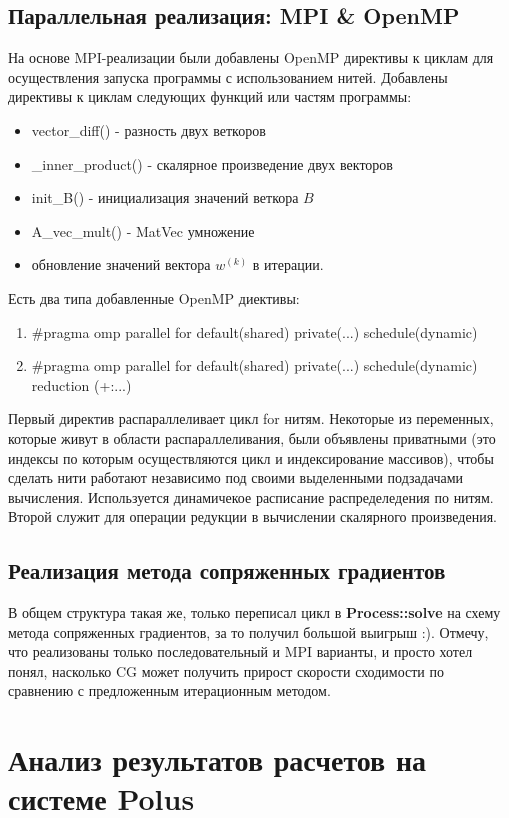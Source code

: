 \documentclass{article}
\begin{document}
\subsection{Параллельная реализация: MPI \& OpenMP}
На основе MPI-реализации были добавлены OpenMP директивы к циклам для осуществления запуска программы с использованием нитей. Добавлены директивы к циклам следующих функций или частям программы:
\begin{itemize}
    \item vector\_diff() - разность двух веткоров
    \item \_inner\_product() - скалярное произведение двух векторов
    \item init\_B() - инициализация значений веткора $B$
    \item A\_vec\_mult() - MatVec умножение
    \item обновление значений вектора $w^{(k)}$ в итерации.
\end{itemize}
Есть два типа добавленные OpenMP диективы:
\begin{enumerate}
    \item \#pragma omp parallel for default(shared) private(...) schedule(dynamic)
    \item \#pragma omp parallel for default(shared) private(...) schedule(dynamic) reduction (+:...)
\end{enumerate}
Первый директив распараллеливает цикл for нитям. Некоторые из переменных, которые живут в области распараллеливания, были объявлены приватными (это индексы по которым осуществляются цикл и индексирование массивов), чтобы сделать нити работают независимо под своими выделенными подзадачами вычисления. Используется динамичекое расписание распределедения по нитям. Второй служит для операции редукции в вычислении скалярного произведения.  

\subsection{Реализация метода сопряженных градиентов}
В общем структура такая же, только переписал цикл в \textbf{Process::solve} на схему метода сопряженных градиентов, за то получил большой выигрыш :). Отмечу, что реализованы только последовательный и MPI варианты, и просто хотел понял, насколько CG может получить прирост скорости сходимости по сравнению с предложенным итерационным методом.

\section{Анализ результатов расчетов на системе Polus}
\end{document}

